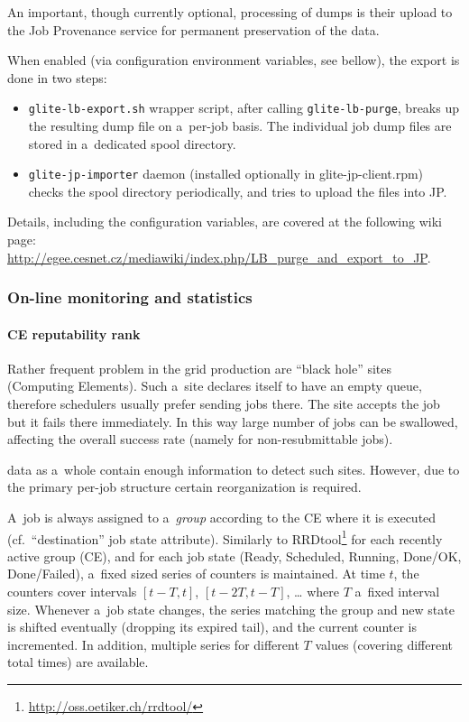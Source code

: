 An important, though currently optional, processing of \LB dumps
is their upload to the Job Provenance service for permanent preservation
of the data.


When enabled (via configuration environment variables, see bellow), 
the export is done in two steps:
\begin{itemize}
\item \verb'glite-lb-export.sh' wrapper script, after calling \verb'glite-lb-purge', breaks up the resulting dump file on a~per-job basis.
The individual job dump files are stored in a~dedicated spool directory.
\item \verb'glite-jp-importer' daemon (installed optionally in glite-jp-client.rpm) checks the spool directory periodically,
and tries to upload the files into JP.
\end{itemize}

Details, including the configuration variables, are covered at the following
wiki page:
\url{http://egee.cesnet.cz/mediawiki/index.php/LB_purge_and_export_to_JP}.

\subsubsection{On-line monitoring and statistics}
\label{maintain:statistics}

\paragraph{CE reputability rank}

Rather frequent problem in the grid production are ``black hole'' sites (Computing Elements).
Such a~site declares itself to have an empty queue, therefore schedulers usually prefer sending
jobs there. The site accepts the job but it fails there immediately.
In this way large number of jobs can be swallowed, affecting the overall success rate
(namely for non-resubmittable jobs).

\LB data as a~whole contain enough information to detect such sites.
However, due to the primary per-job structure certain reorganization is required.

A~job is always assigned to a~\emph{group} according to
the CE where it is executed (cf.\ ``destination'' job state attribute).
Similarly to RRDtool\footnote{\url{http://oss.oetiker.ch/rrdtool/}}
for each recently active group (CE),
and for each job state (Ready, Scheduled, Running, Done/OK, Done/Failed),
a~fixed sized series of counters is maintained.
At time $t$, the counters cover intervals $[t-T,t]$, $[t-2T,t-T]$, \dots
where $T$ a~fixed interval size.
Whenever a~job state changes, the series matching the group and new state
is shifted eventually (dropping its expired tail), and the current counter
is incremented.
In addition, multiple series for different $T$ values (\ie covering different
total times) are available. 


